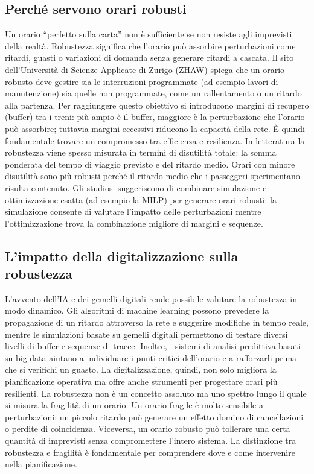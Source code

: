 \documentclass[a4paper,12pt]{report}
\begin{document}
\subsection{Perché servono orari robusti}
Un orario “perfetto sulla carta” non è sufficiente se non resiste agli imprevisti della realtà. Robustezza significa che l’orario può assorbire perturbazioni come ritardi, guasti o variazioni di domanda senza generare ritardi a cascata. Il sito dell’Università di Scienze Applicate di Zurigo (ZHAW) spiega che un orario robusto deve gestire sia le interruzioni programmate (ad esempio lavori di manutenzione) sia quelle non programmate, come un rallentamento o un ritardo alla partenza.
Per raggiungere questo obiettivo si introducono margini di recupero (buffer) tra i treni: più ampio è il buffer, maggiore è la perturbazione che l’orario può assorbire; tuttavia margini eccessivi riducono la capacità della rete. È quindi fondamentale trovare un compromesso tra efficienza e resilienza.
In letteratura la robustezza viene spesso misurata in termini di disutilità totale: la somma ponderata del tempo di viaggio previsto e del ritardo medio. Orari con minore disutilità sono più robusti perché il ritardo medio che i passeggeri sperimentano risulta contenuto.
Gli studiosi suggeriscono di combinare simulazione e ottimizzazione esatta (ad esempio la MILP) per generare orari robusti: la simulazione consente di valutare l’impatto delle perturbazioni mentre l’ottimizzazione trova la combinazione migliore di margini e sequenze.
\subsection{L’impatto della digitalizzazione sulla robustezza}
L’avvento dell’IA e dei gemelli digitali rende possibile valutare la robustezza in modo dinamico. Gli algoritmi di machine learning possono prevedere la propagazione di un ritardo attraverso la rete e suggerire modifiche in tempo reale, mentre le simulazioni basate su gemelli digitali permettono di testare diversi livelli di buffer e sequenze di tracce. 
Inoltre, i sistemi di analisi predittiva basati su big data aiutano a individuare i punti critici dell’orario e a rafforzarli prima che si verifichi un guasto.
La digitalizzazione, quindi, non solo migliora la pianificazione operativa ma offre anche strumenti per progettare orari più resilienti.
La robustezza non è un concetto assoluto ma uno spettro lungo il quale si misura la fragilità di un orario. Un orario fragile è molto sensibile a perturbazioni: un piccolo ritardo può generare un effetto domino di cancellazioni o perdite di coincidenza. Viceversa, un orario robusto può tollerare una certa quantità di imprevisti senza compromettere l’intero sistema. La distinzione tra robustezza e fragilità è fondamentale per comprendere dove e come intervenire nella pianificazione.
\end{document}

